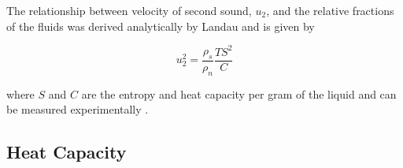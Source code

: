 The relationship between velocity of second sound, $u_2$, and the
relative fractions of the fluids was derived analytically by Landau
and is given by

\begin{equation}
u_2^2 = \frac{\rho_s}{\rho_n}\frac{T S^2}{C}
\end{equation}

where $S$ and $C$ are the entropy and heat capacity per gram of the
liquid and can be measured experimentally \cite{atkins}. 

\subsection{Heat Capacity}
